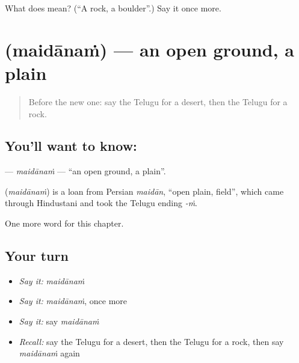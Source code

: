 \begin{tcolorbox}[breakable,colback=teal!4,colframe=teal!35!black,title={Before you move on}]
What does  mean? (\textquotedblleft{}A rock, a boulder\textquotedblright{}.) Say it once more.
\end{tcolorbox}
\section[\texorpdfstring{\te{మైదానం} (maidānaṁ)}{మైదానం (maidānaṁ)}]{ (maidānaṁ) — an open ground, a plain}

\label{lesson:TE-C215-maidanam}



\begin{quote}
Before the new one: say the Telugu for a desert, then the Telugu for a rock.
\end{quote}

\subsection*{You'll want to know: }
\textbf{} — \emph{maidānaṁ} — \textquotedblleft{}an open ground, a plain\textquotedblright{}.

\begin{cousinweb}
\textbf{} (\emph{maidānaṁ}) is a loan from Persian \emph{maidān}, \textquotedblleft{}open plain, field\textquotedblright{}, which came through Hindustani and took the Telugu ending \emph{-ṁ}.
\end{cousinweb}

\begin{grammarlens}[title={What you've built}]
One more word for this chapter.
\end{grammarlens}

\subsection*{Your turn}
\begin{itemize}
\raggedright
  \item \emph{Say it:} \emph{maidānaṁ}
  \item \emph{Say it:} \emph{maidānaṁ}, once more
  \item \emph{Say it:} say \emph{maidānaṁ}
  \item \emph{Recall:} say the Telugu for a desert, then the Telugu for a rock, then say \emph{maidānaṁ} again
\end{itemize}


